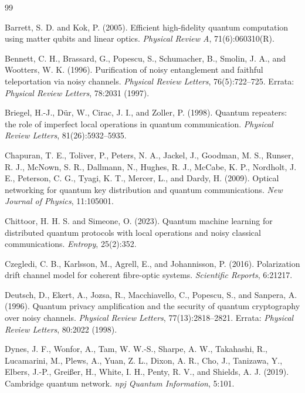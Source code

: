 \documentclass[12pt]{article}
\begin{document}
\begin{thebibliography}{99}

 Barrett, S. D. and Kok, P. (2005). Efficient high-fidelity quantum
computation using matter qubits and linear optics. \emph{Physical Review A},
71(6):060310(R).

 Bennett, C. H., Brassard, G., Popescu, S., Schumacher, B., Smolin,
J. A., and Wootters, W. K. (1996). Purification of noisy entanglement and
faithful teleportation via noisy channels. \emph{Physical Review Letters},
76(5):722--725. Errata: \emph{Physical Review Letters}, 78:2031 (1997).

 Briegel, H.-J., Dür, W., Cirac, J. I., and Zoller, P. (1998). Quantum
repeaters: the role of imperfect local operations in quantum communication.
\emph{Physical Review Letters}, 81(26):5932--5935.

 Chapuran, T. E., Toliver, P., Peters, N. A., Jackel, J., Goodman,
M. S., Runser, R. J., McNown, S. R., Dallmann, N., Hughes, R. J., McCabe,
K. P., Nordholt, J. E., Peterson, C. G., Tyagi, K. T., Mercer, L., and Dardy,
H. (2009). Optical networking for quantum key distribution and quantum
communications. \emph{New Journal of Physics}, 11:105001.

 Chittoor, H. H. S. and Simeone, O. (2023). Quantum machine learning
for distributed quantum protocols with local operations and noisy classical
communications. \emph{Entropy}, 25(2):352.

 Czegledi, C. B., Karlsson, M., Agrell, E., and Johannisson, P. (2016).
Polarization drift channel model for coherent fibre-optic systems.
\emph{Scientific Reports}, 6:21217.

 Deutsch, D., Ekert, A., Jozsa, R., Macchiavello, C., Popescu, S., and
Sanpera, A. (1996). Quantum privacy amplification and the security of quantum
cryptography over noisy channels. \emph{Physical Review Letters},
77(13):2818--2821. Errata: \emph{Physical Review Letters}, 80:2022 (1998).

 Dynes, J. F., Wonfor, A., Tam, W. W.-S., Sharpe, A. W., Takahashi, R.,
Lucamarini, M., Plews, A., Yuan, Z. L., Dixon, A. R., Cho, J., Tanizawa, Y.,
Elbers, J.-P., Greißer, H., White, I. H., Penty, R. V., and Shields, A. J.
(2019). Cambridge quantum network. \emph{npj Quantum Information}, 5:101.


\end{thebibliography}
\end{document}
